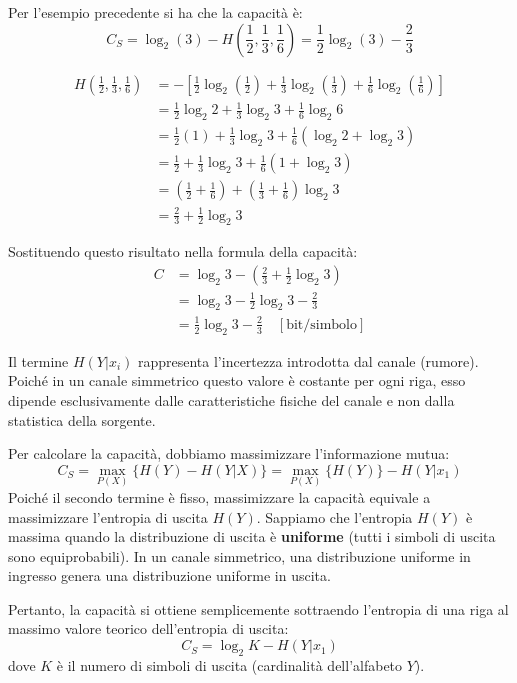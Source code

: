 Per l'esempio precedente si ha che la capacità è:
\[C_S = \log_2(3) - H\left(\frac{1}{2},\frac{1}{3},\frac{1}{6}\right) = \frac{1}{2}\log_2(3) - \frac{2}{3}\]

\begin{align*}
H\left(\frac{1}{2}, \frac{1}{3}, \frac{1}{6}\right) &= - \left[ \frac{1}{2}\log_2\left(\frac{1}{2}\right) + \frac{1}{3}\log_2\left(\frac{1}{3}\right) + \frac{1}{6}\log_2\left(\frac{1}{6}\right) \right] \\
&= \frac{1}{2}\log_2 2 + \frac{1}{3}\log_2 3 + \frac{1}{6}\log_2 6 \\
&= \frac{1}{2}(1) + \frac{1}{3}\log_2 3 + \frac{1}{6}(\log_2 2 + \log_2 3) \\
&= \frac{1}{2} + \frac{1}{3}\log_2 3 + \frac{1}{6}(1 + \log_2 3) \\
&= \left( \frac{1}{2} + \frac{1}{6} \right) + \left( \frac{1}{3} + \frac{1}{6} \right)\log_2 3 \\
&= \frac{2}{3} + \frac{1}{2}\log_2 3
\end{align*}

Sostituendo questo risultato nella formula della capacità:
\begin{align*}
C &= \log_2 3 - \left( \frac{2}{3} + \frac{1}{2}\log_2 3 \right) \\
&= \log_2 3 - \frac{1}{2}\log_2 3 - \frac{2}{3} \\
&= \frac{1}{2}\log_2 3 - \frac{2}{3} \quad [\text{bit/simbolo}]
\end{align*}

Il termine $H(Y|x_i)$ rappresenta l'incertezza introdotta dal canale (rumore). Poiché in un canale simmetrico questo valore è costante per ogni riga, esso dipende esclusivamente dalle caratteristiche fisiche del canale e non dalla statistica della sorgente.

Per calcolare la capacità, dobbiamo massimizzare l'informazione mutua:
\[ C_S = \max_{P(X)} \{ H(Y) - H(Y|X) \} = \max_{P(X)} \{ H(Y) \} - H(Y|x_1) \]
Poiché il secondo termine è fisso, massimizzare la capacità equivale a massimizzare l'entropia di uscita $H(Y)$.
Sappiamo che l'entropia $H(Y)$ è massima quando la distribuzione di uscita è \textbf{uniforme} (tutti i simboli di uscita sono equiprobabili).
In un canale simmetrico, una distribuzione uniforme in ingresso genera una distribuzione uniforme in uscita.

Pertanto, la capacità si ottiene semplicemente sottraendo l'entropia di una riga al massimo valore teorico dell'entropia di uscita:
\[ C_S = \log_2 K - H(Y|x_1) \]
dove $K$ è il numero di simboli di uscita (cardinalità dell'alfabeto $Y$).


